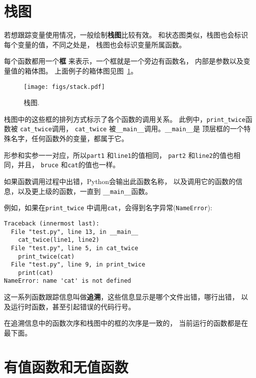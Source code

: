 \documentclass[10pt]{book}
\begin{document}
\section{栈图}
\label{stackdiagram}
若想跟踪变量使用情况，一般绘制{\bf 栈图}比较有效。
和状态图类似，栈图也会标识每个变量的值，不同之处是，
栈图也会标识变量所属函数。

每个函数都用一个{\bf 框} 来表示，一个框就是一个旁边有函数名，
内部是参数以及变量值的箱体图。
上面例子的箱体图见图~\ref{fig.stack}。

\begin{figure}
\centerline
{\texttt{[image: figs/stack.pdf]}}
\caption{栈图.}
\label{fig.stack}
\end{figure}

栈图中的这些框的排列方式标示了各个函数的调用关系。
此例中，\verb"print_twice"函数被 \verb"cat_twice"调用，
\verb"cat_twice" 被\verb"__main__"调用。\verb"__main__"是
顶层框的一个特殊名字，任何函数外的变量，都属于它。

形参和实参一一对应，所以{\tt part1} 和{\tt line1}的值相同，
{\tt part2} 和{\tt line2}的值也相同，并且，
 {\tt bruce} 和{\tt cat}的值也一样。

如果函数调用过程中出错，Python会输出此函数名称，
以及调用它的函数的信息，以及更上级的函数，一直到
 \verb"__main__"函数。

例如，如果在\verb"print_twice" 中调用{\tt cat}，会得到名字异常({\tt NameError}):

\begin{verbatim}
Traceback (innermost last):
  File "test.py", line 13, in __main__
    cat_twice(line1, line2)
  File "test.py", line 5, in cat_twice
    print_twice(cat)
  File "test.py", line 9, in print_twice
    print(cat)
NameError: name 'cat' is not defined
\end{verbatim}
%
这一系列函数跟踪信息叫做{\bf 追溯}，这些信息显示是哪个文件出错，哪行出错，
以及运行时函数，甚至引起错误的代码行号。

在追溯信息中的函数次序和栈图中的框的次序是一致的，
当前运行的函数都是在最下面。

\section{有值函数和无值函数}
\end{document}
